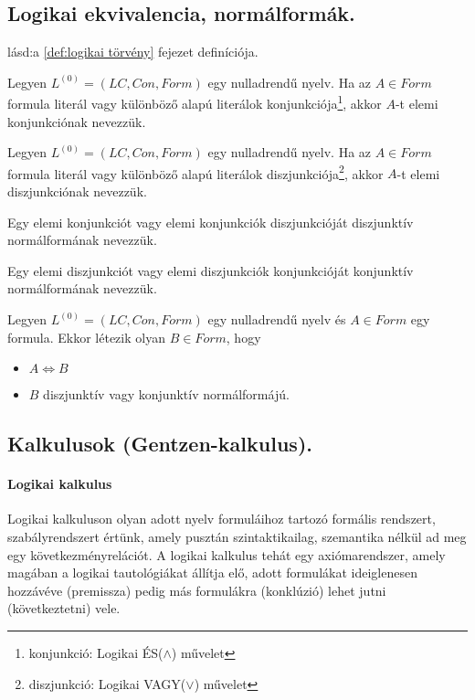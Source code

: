 \subsection{Logikai ekvivalencia, normálformák.}
\begin{definition}
	lásd:a \ref{def:logikai törvény} fejezet definíciója.
\end{definition}
\begin{definition}
	Legyen $L^{(0)} = (LC, Con, Form)$ egy nulladrendű nyelv. Ha az $A \in Form$ formula literál vagy különböző alapú literálok konjunkciója\footnote{konjunkció: Logikai ÉS($\land$) művelet}, akkor $A$-t elemi konjunkciónak nevezzük. 
\end{definition}
\begin{definition}
	Legyen $L^{(0)} = (LC, Con, Form)$ egy nulladrendű nyelv. Ha az $A \in Form$ formula literál vagy különböző alapú literálok diszjunkciója\footnote{diszjunkció: Logikai VAGY($\lor$) művelet}, akkor $A$-t elemi diszjunkciónak nevezzük. 
\end{definition}
\begin{definition}
	Egy elemi konjunkciót vagy elemi konjunkciók diszjunkcióját diszjunktív normálformának nevezzük. 
\end{definition}
\begin{definition}
	Egy elemi diszjunkciót vagy elemi diszjunkciók konjunkcióját konjunktív normálformának nevezzük.
\end{definition}
\begin{definition}
	Legyen $L^{(0)} = (LC, Con, Form)$ egy nulladrendű nyelv és $A \in Form$ egy formula. Ekkor létezik olyan $B \in Form$, hogy
	\begin{itemize}
		\item $A\Leftrightarrow B$
		\item $B$ diszjunktív vagy konjunktív normálformájú. 
	\end{itemize}

\end{definition}

\subsection{Kalkulusok (Gentzen-kalkulus).}

\paragraph{Logikai kalkulus} 
Logikai kalkuluson olyan adott nyelv formuláihoz tartozó formális rendszert, szabályrendszert értünk, amely pusztán szintaktikailag, szemantika nélkül ad meg egy következményrelációt. A logikai kalkulus tehát egy axiómarendszer, amely magában a logikai tautológiákat állítja elő, adott formulákat ideiglenesen hozzávéve (premissza) pedig más formulákra (konklúzió) lehet jutni (következtetni) vele.

